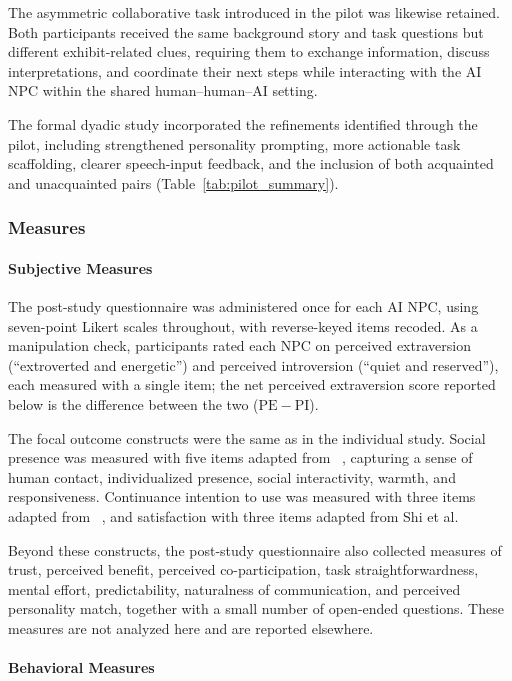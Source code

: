 \documentclass[a4paper,fleqn]{cas-sc}
\begin{document}
The asymmetric collaborative task introduced in the pilot was likewise retained. Both participants received the same background story and task questions but different exhibit-related clues, requiring them to exchange information, discuss interpretations, and coordinate their next steps while interacting with the AI NPC within the shared human--human--AI setting.

The formal dyadic study incorporated the refinements identified through the pilot, including strengthened personality prompting, more actionable task scaffolding, clearer speech-input feedback, and the inclusion of both acquainted and unacquainted pairs (Table~\ref{tab:pilot_summary}).

\subsubsection{Measures}

\paragraph{Subjective Measures}

The post-study questionnaire was administered once for each AI NPC, using seven-point Likert scales throughout, with reverse-keyed items recoded. As a manipulation check, participants rated each NPC on perceived extraversion (``extroverted and energetic'') and perceived introversion (``quiet and reserved''), each measured with a single item; the net perceived extraversion score reported below is the difference between the two ($\mathrm{PE}-\mathrm{PI}$).

The focal outcome constructs were the same as in the individual study. Social presence was measured with five items adapted from ~\cite{gefenConsumerTrustB2C2004}, capturing a sense of human contact, individualized presence, social interactivity, warmth, and responsiveness. Continuance intention to use was measured with three items adapted from ~\cite{liChatbotsEcommerceEffect2023}, and satisfaction with three items adapted from Shi et al.

Beyond these constructs, the post-study questionnaire also collected measures of trust, perceived benefit, perceived co-participation, task straightforwardness, mental effort, predictability, naturalness of communication, and perceived personality match, together with a small number of open-ended questions. These measures are not analyzed here and are reported elsewhere.

\paragraph{Behavioral Measures}
\end{document}
